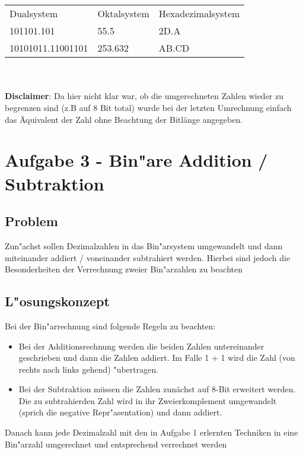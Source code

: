 \documentclass[a4paper,11pt,titlepage]{article}
\begin{document}
    \\ \\

    \begin{table}
        \centering
        \begin{tabular}{lll}
            Dualsystem        & Oktalsystem & Hexadezimalsystem \\
            101101.101        & 55.5        & 2D.A              \\
            10101011.11001101 & 253.632     & AB.CD             \\
        \end{tabular}\label{tab:table}
    \end{table}
    \\ \\

    \noindent \textbf{Disclaimer}: Da hier nicht klar war, ob die umgerechneten Zahlen wieder zu begrenzen sind (z.B auf 8 Bit total) wurde bei der letzten Umrechnung einfach das Äquivalent der Zahl ohne Beachtung der Bitlänge angegeben.


    \section{Aufgabe 3 - Bin"are Addition / Subtraktion}

    \subsection{Problem}
    Zun"achst sollen Dezimalzahlen in das Bin"arsystem umgewandelt und dann miteinander addiert / voneinander subtrahiert werden. Hierbei sind jedoch die Besonderheiten der Verrechnung zweier Bin"arzahlen zu beachten

    \subsection{L"osungskonzept}
    Bei der Bin"arrechnung sind folgende Regeln zu beachten:
    \begin{itemize}
        \item Bei der Additionsrechnung werden die beiden Zahlen untereinander geschrieben und dann die Zahlen addiert. Im Falle 1 + 1 wird die Zahl (von rechts nach links gehend) "ubertragen.
        \item Bei der Subtraktion müssen die Zahlen zunächst auf 8-Bit erweitert werden. Die zu subtrahierden Zahl wird in ihr Zweierkomplement umgewandelt (sprich die negative Repr"asentation) und dann addiert.
    \end{itemize}
    Danach kann jede Dezimalzahl mit den in Aufgabe 1 erlernten Techniken in eine Bin"arzahl umgerechnet und entsprechend verrechnet werden
\end{document}
